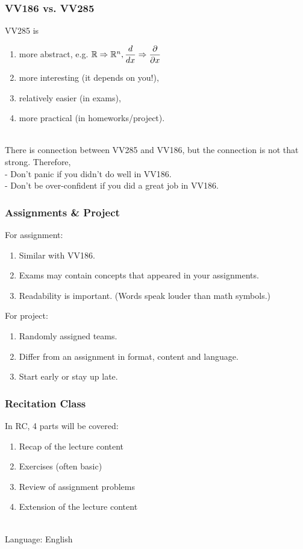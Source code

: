 \documentclass[UTF8]{beamer}
\newcommand{\nullspace}{~\\[15pt]}
\begin{document}
\begin{frame}
    \frametitle{VV186 vs. VV285}
    VV285 is
    \begin{enumerate}
        \item more abstract,     e.g. $\mathbb{R}\Rightarrow\mathbb{R}^n, \dfrac{d}{dx}\Rightarrow\dfrac{\partial}{\partial x}$
        \item more interesting (it depends on you!),
        \item relatively easier (in exams),
        \item more practical (in homeworks/project).
    \end{enumerate}
    \nullspace
    There is connection between VV285 and VV186, but the connection is not that strong. Therefore,\\
    - Don't panic if you didn't do well in VV186.\\
    - Don't be over-confident if you did a great job in VV186.
\end{frame}

\begin{frame}
    \frametitle{Assignments \& Project}
    For assignment:
    \begin{enumerate}
        \item Similar with VV186.
        \item Exams may contain concepts that appeared in your assignments.
        \item Readability is important. (Words speak louder than math symbols.)
    \end{enumerate}

    For project:
    \begin{enumerate}
        \item Randomly assigned teams.
        \item Differ from an assignment in format, content and language.
        \item Start early or stay up late.
    \end{enumerate}
\end{frame}

\begin{frame}
    \frametitle{Recitation Class}
    In RC, 4 parts will be covered:
    \begin{enumerate}
        \item Recap of the lecture content
        \item Exercises (often basic)
        \item Review of assignment problems
        \item Extension of the lecture content
    \end{enumerate}
    \nullspace
    Language: English
\end{frame}
\end{document}
